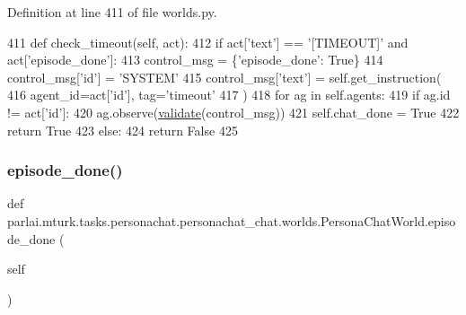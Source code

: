 Definition at line 411 of file worlds.\+py.


\begin{DoxyCode}
411     \textcolor{keyword}{def }check\_timeout(self, act):
412         \textcolor{keywordflow}{if} act[\textcolor{stringliteral}{'text'}] == \textcolor{stringliteral}{'[TIMEOUT]'} \textcolor{keywordflow}{and} act[\textcolor{stringliteral}{'episode\_done'}]:
413             control\_msg = \{\textcolor{stringliteral}{'episode\_done'}: \textcolor{keyword}{True}\}
414             control\_msg[\textcolor{stringliteral}{'id'}] = \textcolor{stringliteral}{'SYSTEM'}
415             control\_msg[\textcolor{stringliteral}{'text'}] = self.get\_instruction(
416                 agent\_id=act[\textcolor{stringliteral}{'id'}], tag=\textcolor{stringliteral}{'timeout'}
417             )
418             \textcolor{keywordflow}{for} ag \textcolor{keywordflow}{in} self.agents:
419                 \textcolor{keywordflow}{if} ag.id != act[\textcolor{stringliteral}{'id'}]:
420                     ag.observe(\hyperlink{namespaceparlai_1_1core_1_1worlds_afc3fad603b7bce41dbdc9cdc04a9c794}{validate}(control\_msg))
421             self.chat\_done = \textcolor{keyword}{True}
422             \textcolor{keywordflow}{return} \textcolor{keyword}{True}
423         \textcolor{keywordflow}{else}:
424             \textcolor{keywordflow}{return} \textcolor{keyword}{False}
425 
\end{DoxyCode}
\mbox{\label{classparlai_1_1mturk_1_1tasks_1_1personachat_1_1personachat__chat_1_1worlds_1_1PersonaChatWorld_a9497024a85da74e69e5b6a1568b5ff18}} 
\subsubsection{\texorpdfstring{episode\+\_\+done()}{episode\_done()}}
{\footnotesize\ttfamily def parlai.\+mturk.\+tasks.\+personachat.\+personachat\+\_\+chat.\+worlds.\+Persona\+Chat\+World.\+episode\+\_\+done (\begin{DoxyParamCaption}\item[{}]{self }\end{DoxyParamCaption})}



